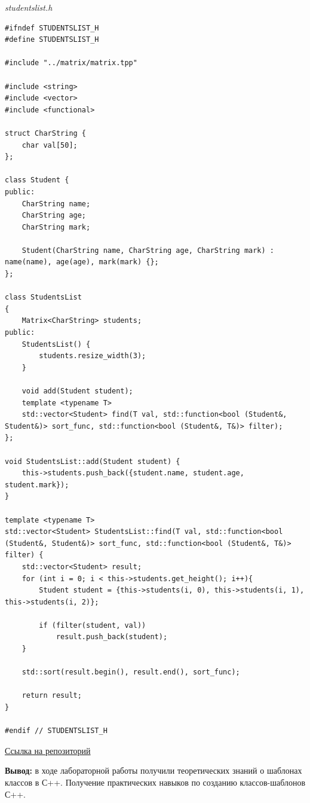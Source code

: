 \documentclass[a4paper,14pt]{extarticle}
\begin{document}
\textit{studentslist.h}
\begin{verbatim}
#ifndef STUDENTSLIST_H
#define STUDENTSLIST_H

#include "../matrix/matrix.tpp"

#include <string>
#include <vector>
#include <functional>

struct CharString {
    char val[50];
};

class Student {
public:
    CharString name;
    CharString age;
    CharString mark;

    Student(CharString name, CharString age, CharString mark) : name(name), age(age), mark(mark) {};
};

class StudentsList
{
    Matrix<CharString> students;
public:
    StudentsList() {
        students.resize_width(3);
    }

    void add(Student student);
    template <typename T>
    std::vector<Student> find(T val, std::function<bool (Student&, Student&)> sort_func, std::function<bool (Student&, T&)> filter);
};

void StudentsList::add(Student student) {
    this->students.push_back({student.name, student.age, student.mark});
}

template <typename T>
std::vector<Student> StudentsList::find(T val, std::function<bool (Student&, Student&)> sort_func, std::function<bool (Student&, T&)> filter) {
    std::vector<Student> result;
    for (int i = 0; i < this->students.get_height(); i++){
        Student student = {this->students(i, 0), this->students(i, 1), this->students(i, 2)};

        if (filter(student, val))
            result.push_back(student);
    }

    std::sort(result.begin(), result.end(), sort_func);

    return result;
}

#endif // STUDENTSLIST_H
\end{verbatim}

\href{https://github.com/IAmProgrammist/oop/tree/master}{Ссылка на репозиторий}

\textbf{Вывод: } в ходе лабораторной работы получили 
теоретических знаний о шаблонах классов в С++.
Получение практических навыков по созданию классов-шаблонов С++.
\end{document}
